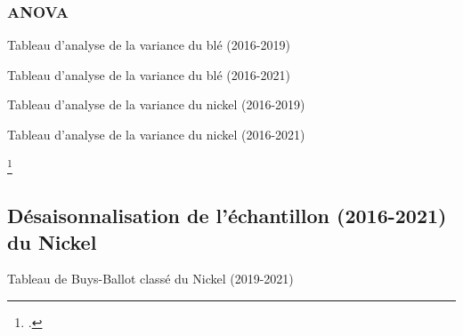 \documentclass[12pt,a4paper]{article}
\begin{document}
\subsubsection{ANOVA}\label{appendix:anova}
\begin{table}[H]
    \centering
    \caption{Tableau d'analyse de la variance du blé (2016-2019) }
    \label{tab:anova_ble19}
    \sffamily
    
\end{table}
\begin{table}[H]
    \centering
    \caption{Tableau d'analyse de la variance du blé (2016-2021) }
    \label{tab:anova_ble21}
    \sffamily
    
\end{table}
\begin{table}[H]
    \centering
    \caption{Tableau d'analyse de la variance du nickel (2016-2019) }
    \label{tab:anova_nickel19}
    \sffamily
    
\end{table}
\begin{table}[H]
    \centering
    \caption{Tableau d'analyse de la variance du nickel (2016-2021) }
    \label{tab:anova_nickel21}
    \sffamily
    
\end{table}
\begin{table}[htpb]
    \centering
    \caption[test]{Analyse de la variance\footnotemark }
    \label{tab:anova}
\end{table}
\footcitetext{terraza}
\subsection{Désaisonnalisation de l'échantillon (2016-2021) du Nickel}
\begin{table}[H]
    \centering
    \caption{Tableau de Buys-Ballot classé du Nickel (2019-2021)}
    \label{tab:bbc}
    \sffamily
    \resizebox{\textwidth}{!}{}
\end{table}
\end{document}
